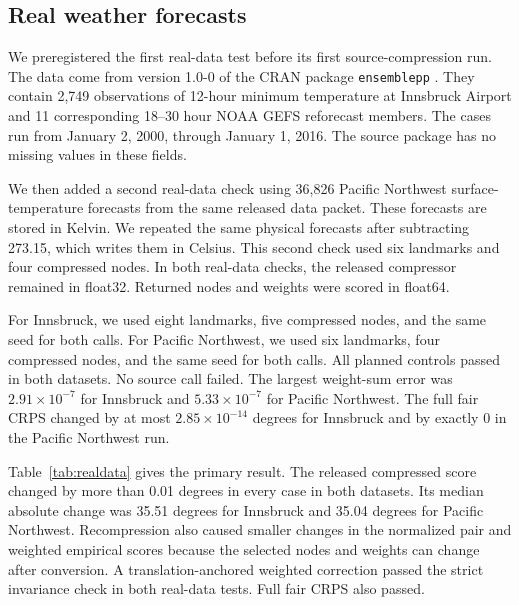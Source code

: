 \documentclass[11pt]{article}
\begin{document}
\subsection{Real weather forecasts}

We preregistered the first real-data test before its first source-compression run. The data come from version 1.0-0 of the CRAN package \texttt{ensemblepp} \cite{ensemblepp}. They contain 2,749 observations of 12-hour minimum temperature at Innsbruck Airport and 11 corresponding 18--30 hour NOAA GEFS reforecast members. The cases run from January 2, 2000, through January 1, 2016. The source package has no missing values in these fields.

We then added a second real-data check using 36,826 Pacific Northwest surface-temperature forecasts from the same released data packet. These forecasts are stored in Kelvin. We repeated the same physical forecasts after subtracting 273.15, which writes them in Celsius. This second check used six landmarks and four compressed nodes. In both real-data checks, the released compressor remained in float32. Returned nodes and weights were scored in float64.

For Innsbruck, we used eight landmarks, five compressed nodes, and the same seed for both calls. For Pacific Northwest, we used six landmarks, four compressed nodes, and the same seed for both calls. All planned controls passed in both datasets. No source call failed. The largest weight-sum error was $2.91\times10^{-7}$ for Innsbruck and $5.33\times10^{-7}$ for Pacific Northwest. The full fair CRPS changed by at most $2.85\times10^{-14}$ degrees for Innsbruck and by exactly 0 in the Pacific Northwest run.

Table~\ref{tab:realdata} gives the primary result. The released compressed score changed by more than 0.01 degrees in every case in both datasets. Its median absolute change was 35.51 degrees for Innsbruck and 35.04 degrees for Pacific Northwest. Recompression also caused smaller changes in the normalized pair and weighted empirical scores because the selected nodes and weights can change after conversion. A translation-anchored weighted correction passed the strict invariance check in both real-data tests. Full fair CRPS also passed.
\end{document}
